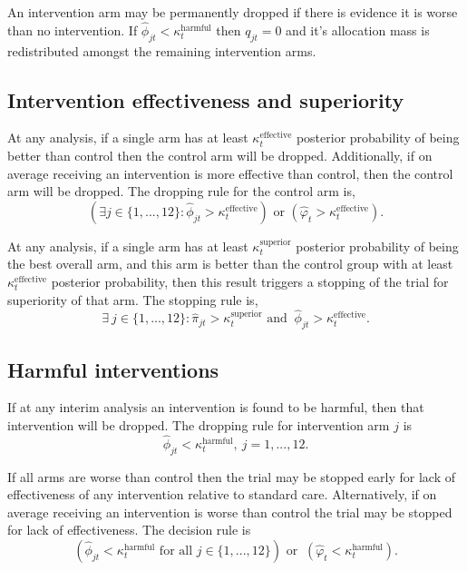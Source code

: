 \documentclass[
  bibliography=totoc]{scrreprt}
\begin{document}
An intervention arm may be permanently dropped if there is evidence it is worse than no intervention.
If \(\hat\phi_{jt}<\kappa_t^{\text{harmful}}\) then \(q_{jt}=0\) and it's allocation mass is redistributed amongst the remaining intervention arms.

\hypertarget{intervention-effectiveness-and-superiority}{%
\subsection{Intervention effectiveness and superiority}\label{intervention-effectiveness-and-superiority}}

At any analysis, if a single arm has at least \(\kappa_t^{\text{effective}}\) posterior probability of being better than control then the control arm will be dropped.
Additionally, if on average receiving an intervention is more effective than control, then the control arm will be dropped.
The dropping rule for the control arm is,
\[
\left(\exists j\in\{1,...,12\}:\hat\phi_{jt}>\kappa_t^{\text{effective}}\right)\text{ or } \left(\hat\varphi_t>\kappa_t^{\text{effective}}\right).
\]

At any analysis, if a single arm has at least \(\kappa_t^{\text{superior}}\) posterior probability of being the best overall arm, and this arm is better than the control group with at least \(\kappa_t^{\text{effective}}\) posterior probability, then this result triggers a stopping of the trial for superiority of that arm.
The stopping rule is,
\[
\exists \ j\in\{1,...,12\} : \hat\pi_{jt}>\kappa_t^{\text{superior}} \text{ and }\ \hat\phi_{jt}>\kappa_t^{\text{effective}}.
\]

\hypertarget{harmful-interventions}{%
\subsection{Harmful interventions}\label{harmful-interventions}}

If at any interim analysis an intervention is found to be harmful, then that intervention will be dropped.
The dropping rule for intervention arm \(j\) is
\[
\hat\phi_{jt}<\kappa_t^{\text{harmful}},\ j=1,...,12.
\]

If all arms are worse than control then the trial may be stopped early for lack of effectiveness of any intervention relative to standard care.
Alternatively, if on average receiving an intervention is worse than control the trial may be stopped for lack of effectiveness.
The decision rule is
\[
\left(\hat\phi_{jt}<\kappa_t^{\text{harmful}}\text{ for all }j\in\{1,...,12\}\right)\text{ or }\ \left(\hat\varphi_t<\kappa_t^{\text{harmful}}\right).
\]
\end{document}
